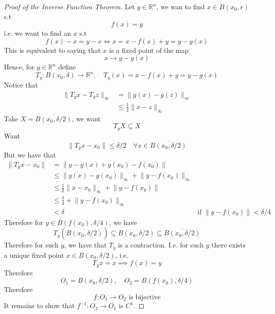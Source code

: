 \documentclass[11pt,a4paper]{article}
\theoremstyle{definition}
\theoremstyle{plain}
\theoremstyle{remark}
\newcommand{\R}{\mathbb{R}}
\newcommand{\norm}[1]{\lVert #1 \rVert}
\begin{document}
\begin{proof}[Proof of the Inverse Function Theorem]
    Let $y \in \R^n$, we wan to find $x \in B(x_0, r)$ s.t 
    $$f(x) = y$$
    i.e. we want to find an $x$ s.t 
    $$f(x) - x = y - x \iff x = x - f(x) + y = y - g(x)$$
    This is equivalent to saying that $x$ is a fixed point of the map 
    $$x \to y - g(x)$$
    Hence, for $y \in \R^n$ define 
    $$T_y \colon B(x_0, \delta) \to \R^n, \quad T_y(x) = x-f(x) + y = y-g(x)$$
    Notice that
    \begin{align*}
        \norm{T_y x - T_yz}_\infty &= \norm{g(x) - g(z)}_\infty \\
        &\le \frac{1}{2} \norm{x-z}_\infty 
    \end{align*}
    Take $X = \overline{B(x_0, \delta/2)}$, we want 
    $$T_y X \subseteq X$$
    Want 
    $$\norm{T_y x - x_0} \le \delta/2 \quad \forall x \in \overline{B(x_0, \delta/2)}$$
    But we have that 
    \begin{align*}
        \norm{T_y x - x_0} &= \norm{y-g(x) + g(x_0) - f(x_0)} \\
        &\le \norm{g(x) - g(x_0)}_\infty + \norm{y - f(x_0)}_\infty \\
        &\le \frac{1}{2} \norm{x-x_0}_\infty + \norm{y-f(x_0)} \\
        &\le \frac{\delta}{4} + \norm{y-f(x_0)}_\infty \\
        &< \delta &\text{if } \norm{y-f(x_0)} < \delta/4
    \end{align*}
    Therefore for $y \in B(f(x_0), \delta/4)$, we have 
    $$T_y (\overline{B(x_0, \delta/2)}) \subseteq B(x_0, \delta/2) \subseteq \overline{B(x_0, \delta/2)}$$
    Therefore for such $y$, we have that $T_y$ is a contraction. I.e. for such $y$ there exists a unique 
    fixed point $x \in B(x_0, \delta/2)$, i.e. 
    $$T_y x = x \implies f(x) = y$$
    Therefore 
    $$O_1 = B(x_0, \delta/2), \quad O_2 = B(f(x_0), \delta/4)$$
    Therefore 
    $$f \colon O_1 \to O_2 \text{ is bijective}$$
    It remains to show that $f^{-1} \colon O_2 \to O_1$ is $C^1$. 


\end{proof}
\end{document}

